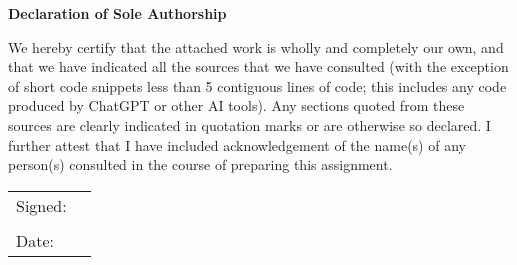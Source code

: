 \documentclass[11pt,a4paper]{article}
\begin{document}
\begin{center}
\bfseries\huge Declaration of Sole Authorship
\end{center}
We hereby certify that the attached work is wholly and completely our own, and that we have indicated all the sources that we have consulted (with the exception of short code snippets less than 5 contiguous lines of code; this includes any code produced by ChatGPT or other AI tools). Any sections quoted from these sources are clearly indicated in quotation marks or are otherwise so declared. I further attest that I have included acknowledgement of the name(s) of any person(s) consulted in the course of preparing this assignment.

\bigskip\bigskip

\begin{tabular}{@{}p{.5in}p{4in}@{}}
Signed: & \hrulefill \\
&\\
Date:&\\
\end{tabular}
\end{document}
